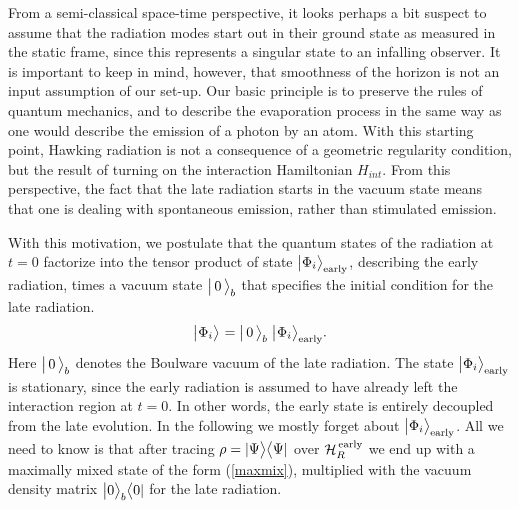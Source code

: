 \documentclass[12pt]{article}%
\def\spc{\hspace{.5pt}}
\def\be{\begin{equation}}
\def\ee{\end{equation}}
\begin{document}
From a semi-classical space-time perspective, it looks perhaps a bit suspect to assume that the radiation modes start out in their ground state as measured in the static frame, 
since this represents a singular state to an infalling observer. It is important to keep in mind, however, that smoothness of the
horizon is not an input assumption of our set-up. Our basic principle is to preserve the rules of quantum mechanics, and to describe the evaporation process in the same
way as one would describe the emission of a photon by an atom. With this starting point, Hawking radiation is not a consequence of a geometric regularity condition, but the result of turning on the interaction Hamiltonian $H_{int}$. From this perspective, the fact that the late radiation starts in the vacuum state means that one is dealing with spontaneous emission, rather than stimulated
emission. 

With this motivation, we postulate that the quantum states of the radiation at $t=0$  factorize into the tensor product of state $\bigl|\Phi_i \bigr\rangle_{\rm early}$, describing the
early radiation, times a vacuum state $\bigl|\,0\,\bigr\rangle_{\mbox{\scriptsize $b$}}$ that specifies the initial condition for the late radiation.
\be
\bigll|\spc   \Phi_\iii \bigrr \rangle_{\! \eE}\,=\bigll|\,0\,\bigrr\rangle_\bB\;
\bigll|\spc 
 \Phi_\iii \bigrr \rangle_{\rm early}. \ee
Here $\bigl|\, 0\,\bigr \rangle_b$ denotes the Boulware vacuum of the late radiation.  
The state $\bigl|\Phi_i\bigr\rangle_{\rm early}$  is stationary, since the early radiation is assumed to have already left the interaction region at $t=0$. In other words, the early state is entirely decoupled from the late evolution. In the following we mostly forget about $\bigl|\Phi_i\bigr\rangle_{\rm early}$. All we need to know is that after tracing $\rho = |\Psi\bigr\rangle \bigl\langle \Psi|$ over  ${\cal H}_R^{\rm \, early}$ we end up with a maximally mixed state of the form (\ref{maxmix}), multiplied with the vacuum density matrix  $\bigl|0\bigr\rangle_{\mbox{\scriptsize $b$}} \bigl\langle 0|$ for the late radiation. 
\end{document}
